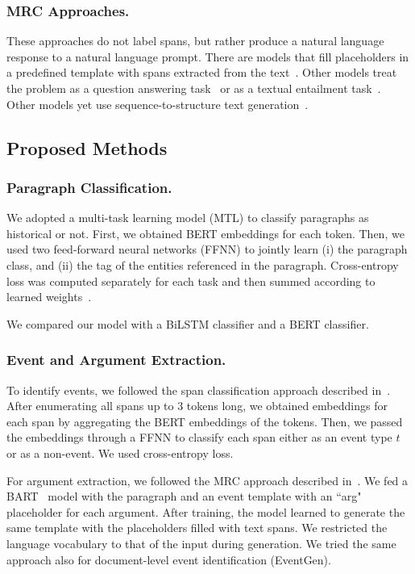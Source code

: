 \documentclass[runningheads]{llncs}
\begin{document}
\subsubsection{MRC Approaches.} These approaches do not label spans, but rather produce a natural language response to a natural language prompt. There are models that fill placeholders in a predefined template with spans extracted from the text~\cite{chen-etal-2020-manual,li-etal-2021-genarg}. Other models treat the problem as a question answering task~\cite{du-cardie-2020-event,feng-etal-2020-probing,liu-etal-2020-mrc} or as a textual entailment task~\cite{feng-etal-2020-probing}. Other models yet use sequence-to-structure text generation~\cite{lu-etal-2021-text2event}.

\subsection{Proposed Methods}

\subsubsection{Paragraph Classification.} We adopted a multi-task learning model (MTL) to classify paragraphs as historical or not. First, we obtained BERT embeddings for each token. Then, we used two feed-forward neural networks (FFNN) to jointly learn (i) the paragraph class, and (ii) the tag of the entities referenced in the paragraph. Cross-entropy loss was computed separately for each task and then summed according to learned weights~\cite{kendall-etal-2017-mtl-loss}.

We compared our model with a BiLSTM classifier and a BERT classifier.

\subsubsection{Event and Argument Extraction.} To identify events, we followed the span classification approach described in~\cite{zhong-chen-2021-frustratingly}. After enumerating all spans up to 3 tokens long, we obtained embeddings for each span by aggregating the BERT embeddings of the tokens. Then, we passed the embeddings through a FFNN to classify each span either as an event type $t$ or as a non-event. We used cross-entropy loss.

For argument extraction, we followed the MRC approach described in~\cite{li-etal-2021-genarg,wen-etal-2021-resin}. We fed a BART~\cite{lewis-etal-2020-bart} model with the paragraph and an event template with an “\textlangle{}arg\textrangle{}"  placeholder for each argument. After training, the model learned to generate the same template with the placeholders filled with text spans. We restricted the language vocabulary to that of the input during generation. We tried the same approach also for document-level event identification (EventGen).
\end{document}
